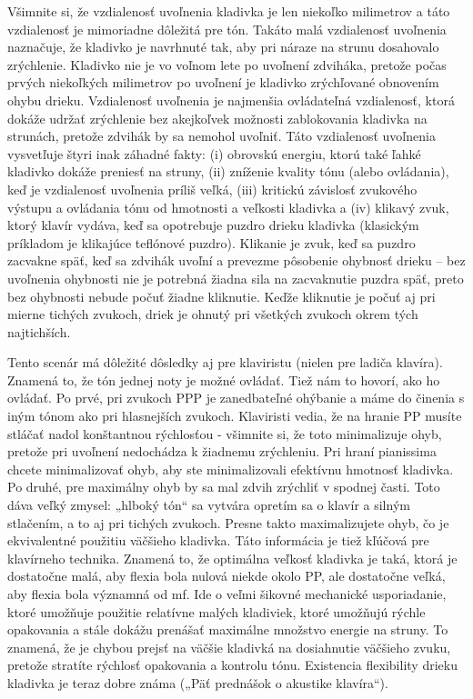 \documentclass[11pt,a4paper%
]{book}
\begin{document}
Všimnite si, že vzdialenosť uvoľnenia kladivka je len niekoľko milimetrov a táto vzdialenosť je mimoriadne dôležitá pre tón. Takáto malá vzdialenosť uvoľnenia naznačuje, že kladivko je navrhnuté tak, aby pri náraze na strunu dosahovalo zrýchlenie. Kladivko nie je vo voľnom lete po uvoľnení zdviháka, pretože počas prvých niekoľkých milimetrov po uvoľnení je kladivko zrýchľované obnovením ohybu drieku. Vzdialenosť uvoľnenia je najmenšia ovládateľná vzdialenosť, ktorá dokáže udržať zrýchlenie bez akejkoľvek možnosti zablokovania kladivka na strunách, pretože zdvihák by sa nemohol uvoľniť. Táto vzdialenosť uvoľnenia vysvetľuje štyri inak záhadné fakty: (i) obrovskú energiu, ktorú také ľahké kladivko dokáže preniesť na struny, (ii) zníženie kvality tónu (alebo ovládania), keď je vzdialenosť uvoľnenia príliš veľká, (iii) kritickú závislosť zvukového výstupu a ovládania tónu od hmotnosti a veľkosti kladivka a (iv) klikavý zvuk, ktorý klavír vydáva, keď sa opotrebuje puzdro drieku kladivka (klasickým príkladom je klikajúce teflónové puzdro). Klikanie je zvuk, keď sa puzdro zacvakne späť, keď sa zdvihák uvoľní a prevezme pôsobenie ohybnosť drieku -- bez uvoľnenia ohybnosti nie je potrebná žiadna sila na zacvaknutie puzdra späť, preto bez ohybnosti nebude počuť žiadne kliknutie. Keďže kliknutie je počuť aj pri mierne tichých zvukoch, driek je ohnutý pri všetkých zvukoch okrem tých najtichších.

Tento scenár má dôležité dôsledky aj pre klaviristu (nielen pre ladiča klavíra). Znamená to, že tón jednej noty je možné ovládať. Tiež nám to hovorí, ako ho ovládať. Po prvé, pri zvukoch PPP je zanedbateľné ohýbanie a máme do činenia s iným tónom ako pri hlasnejších zvukoch. Klaviristi vedia, že na hranie PP musíte stláčať nadol konštantnou rýchlosťou - všimnite si, že toto minimalizuje ohyb, pretože pri uvoľnení nedochádza k žiadnemu zrýchleniu. Pri hraní pianissima chcete minimalizovať ohyb, aby ste minimalizovali efektívnu hmotnosť kladivka. Po druhé, pre maximálny ohyb by sa mal zdvih zrýchliť v spodnej časti. Toto dáva veľký zmysel: „hlboký tón`` sa vytvára opretím sa o klavír a silným stlačením, a to aj pri tichých zvukoch. Presne takto maximalizujete ohyb, čo je ekvivalentné použitiu väčšieho kladivka. Táto informácia je tiež kľúčová pre klavírneho technika. Znamená to, že optimálna veľkosť kladivka je taká, ktorá je dostatočne malá, aby flexia bola nulová niekde okolo PP, ale dostatočne veľká, aby flexia bola významná od mf. Ide o veľmi šikovné mechanické usporiadanie, ktoré umožňuje použitie relatívne malých kladiviek, ktoré umožňujú rýchle opakovania a stále dokážu prenášať maximálne množstvo energie na struny. To znamená, že je chybou prejsť na väčšie kladivká na dosiahnutie väčšieho zvuku, pretože stratíte rýchlosť opakovania a kontrolu tónu. Existencia flexibility drieku kladivka je teraz dobre známa („Päť prednášok o akustike klavíra``).
\end{document}
